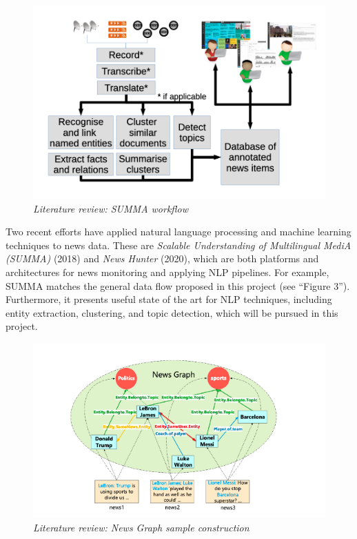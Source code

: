\documentclass[11pt]{article}
\begin{document}
  \begin{figure}
    \centerline{\includegraphics[scale=0.4]{literature-review--summa.png}}
    \caption{\textit{Literature review: SUMMA workflow}}
  \end{figure}

  Two recent efforts have applied natural language processing and machine learning techniques to news data. These are \textit{Scalable Understanding of Multilingual MediA (SUMMA)} \cite{germann2018integrating} (2018) and \textit{News Hunter} \cite{berven2020knowledge} (2020), which are both platforms and architectures for news monitoring and applying NLP pipelines. For example, SUMMA matches the general data flow proposed in this project (see ``Figure 3''). Furthermore, it presents useful state of the art for NLP techniques, including entity extraction, clustering, and topic detection, which will be pursued in this project.

  \begin{figure}
    \centerline{\includegraphics[scale=0.4]{literature-review--newsgraph.png}}
    \caption{\textit{Literature review: News Graph sample construction}}
  \end{figure}
\end{document}

